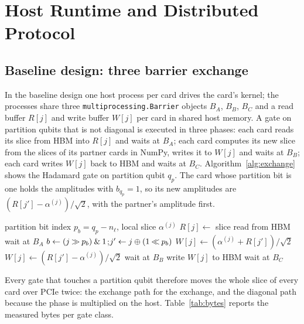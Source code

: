 \section{Host Runtime and Distributed Protocol}\label{sec:host}

\subsection{Baseline design: three barrier exchange}\label{subsec:exchange}

In the baseline design one host process per card drives the card's kernel; the processes share three
\texttt{multiprocessing.Barrier} objects $B_A$, $B_B$, $B_C$ and a read buffer $R[j]$ and write buffer $W[j]$ per card in
shared host memory. A gate on partition qubits that is not diagonal is executed in three phases: each card reads its
slice from HBM into $R[j]$ and waits at $B_A$; each card computes its new slice from the slices of its partner cards in
NumPy, writes it to $W[j]$ and waits at $B_B$; each card writes $W[j]$ back to HBM and waits at $B_C$. Algorithm~\ref{alg:exchange}
shows the Hadamard gate on partition qubit $q_p$. The card whose partition bit is one holds the amplitudes with
$b_{q_p}=1$, so its new amplitudes are $(R[j'] - \alpha^{(j)})/\sqrt{2}$, with the partner's amplitude first.

\begin{algorithm}[t]
\caption{Three barrier exchange for $H$ on partition qubit $q_p$ (card $j$, baseline design).}\label{alg:exchange}
\begin{algorithmic}[1]
\Require partition bit index $p_b = q_p - n_\ell$, local slice $\alpha^{(j)}$
\State $R[j] \gets$ slice read from HBM 
\State wait at $B_A$
\State $b \gets (j \mathbin{\gg} p_b) \mathbin{\&} 1$;\quad $j' \gets j \oplus (1 \mathbin{\ll} p_b)$
  \State $W[j] \gets (\alpha^{(j)} + R[j'])/\sqrt{2}$
\Else
  \State $W[j] \gets (R[j'] - \alpha^{(j)})/\sqrt{2}$
\EndIf
\State wait at $B_B$
\State write $W[j]$ to HBM 
\State wait at $B_C$
\end{algorithmic}
\end{algorithm}

Every gate that touches a partition qubit therefore moves the whole slice of every card over PCIe twice: the exchange
path for the exchange, and the diagonal path because the phase is multiplied on the host. Table~\ref{tab:bytes} reports
the measured bytes per gate class.

